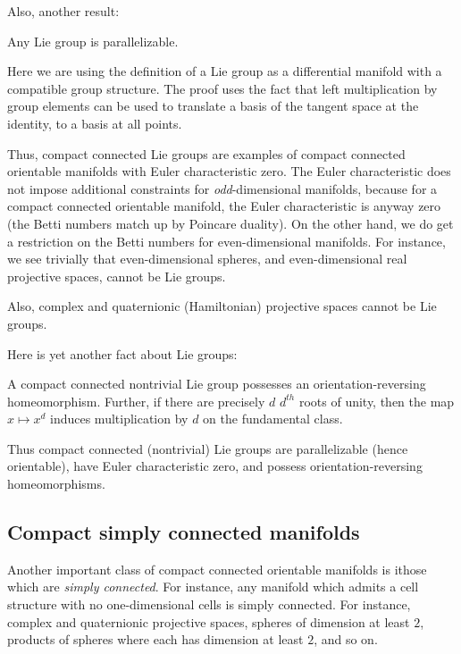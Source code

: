 \documentclass[a4paper]{amsart}
\begin{document}
Also, another result:

\begin{theorem}
  Any Lie group is parallelizable.
\end{theorem}

Here we are using the definition of a Lie group as a differential
manifold with a compatible group structure. The proof uses the fact
that left multiplication by group elements can be used to translate a
basis of the tangent space at the identity, to a basis at all points.

Thus, compact connected Lie groups are examples of compact connected
orientable manifolds with Euler characteristic zero. The Euler
characteristic does not impose additional constraints for {\em
  odd}-dimensional manifolds, because for a compact connected
orientable manifold, the Euler characteristic is anyway zero (the
Betti numbers match up by Poincare duality). On the other hand, we do
get a restriction on the Betti numbers for even-dimensional manifolds.
For instance, we see trivially that even-dimensional spheres, and
even-dimensional real projective spaces, cannot be Lie groups.

Also, complex and quaternionic (Hamiltonian) projective spaces cannot
be Lie groups.


Here is yet another fact about Lie groups:

\begin{theorem}
  A compact connected nontrivial Lie group possesses an
  orientation-reversing homeomorphism. Further, if there are precisely
  $d$ $d^{th}$ roots of unity, then the map $x \mapsto x^d$ induces
  multiplication by $d$ on the fundamental class.
\end{theorem}

Thus compact connected (nontrivial) Lie groups are parallelizable
(hence orientable), have Euler characteristic zero, and possess
orientation-reversing homeomorphisms.

\subsection{Compact simply connected manifolds}

Another important class of compact connected orientable manifolds is
ithose which are {\em simply connected}. For instance, any manifold
which admits a cell structure with no one-dimensional cells is simply
connected. For instance, complex and quaternionic projective spaces,
spheres of dimension at least $2$, products of spheres where each has
dimension at least $2$, and so on.
\end{document}
